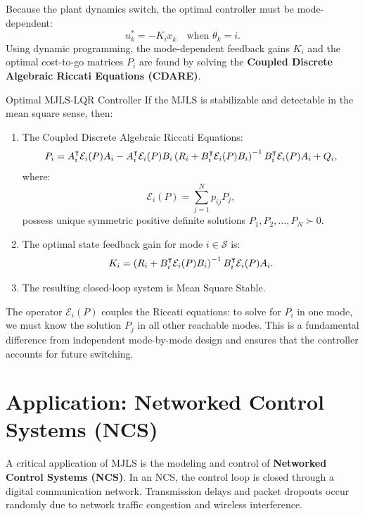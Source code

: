 Because the plant dynamics switch, the optimal controller must be mode-dependent:
\begin{equation}
u_k^* = -K_i x_k \quad \text{when } \theta_k = i .
\end{equation}
Using dynamic programming, the mode-dependent feedback gains $K_i$ and the optimal cost-to-go matrices $P_i$ are found by solving the \textbf{Coupled Discrete Algebraic Riccati Equations (CDARE)}.

\begin{mytheorem}{Optimal MJLS-LQR Controller}
If the MJLS is stabilizable and detectable in the mean square sense, then:
\begin{enumerate}
    \item The Coupled Discrete Algebraic Riccati Equations:
    \begin{equation}
        P_i = A_i^\intercal \mathcal{E}_i(P) A_i - A_i^\intercal \mathcal{E}_i(P) B_i \left( R_i + B_i^\intercal \mathcal{E}_i(P) B_i \right)^{-1} B_i^\intercal \mathcal{E}_i(P) A_i + Q_i , \label{eq:mjls_cdare}
    \end{equation}
    where:
    \begin{equation}
        \mathcal{E}_i(P) = \sum_{j=1}^N p_{ij} P_j , \label{eq:mjls_operator}
    \end{equation}
    possess unique symmetric positive definite solutions $P_1, P_2, \dots, P_N \succ 0$.
    \item The optimal state feedback gain for mode $i \in \mathcal{S}$ is:
    \begin{equation}
        K_i = \left( R_i + B_i^\intercal \mathcal{E}_i(P) B_i \right)^{-1} B_i^\intercal \mathcal{E}_i(P) A_i . \label{eq:mjls_opt_k}
    \end{equation}
    \item The resulting closed-loop system is Mean Square Stable.
\end{enumerate}
\end{mytheorem}
The operator $\mathcal{E}_i(P)$ couples the Riccati equations: to solve for $P_i$ in one mode, we must know the solution $P_j$ in all other reachable modes. This is a fundamental difference from independent mode-by-mode design and ensures that the controller accounts for future switching.

\section{Application: Networked Control Systems (NCS)}
A critical application of MJLS is the modeling and control of \textbf{Networked Control Systems (NCS)}. In an NCS, the control loop is closed through a digital communication network. Transmission delays and packet dropouts occur randomly due to network traffic congestion and wireless interference.

